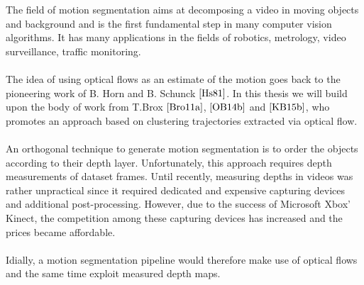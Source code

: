 The field of motion segmentation aims at decomposing a video in moving objects and background and is the first fundamental step in many computer vision algorithms. It has many applications in the fields of robotics, metrology, video surveillance, traffic monitoring. \\ \\
The idea of using optical flows as an estimate of the motion goes back to the pioneering work of B. Horn and B. Schunck $\cite{Hs81}$. In this thesis we will build upon the body of work from T.Brox $\cite{Bro11a}$, $\cite{OB14b}$ and $\cite{KB15b}$, who promotes an approach based on clustering trajectories extracted via optical flow. \\ \\
An orthogonal technique to generate motion segmentation is to order the objects according to their depth layer. Unfortunately, this approach requires depth measurements of dataset frames. Until recently, measuring depths in videos was rather unpractical since it required dedicated and expensive capturing devices and additional post-processing. However, due to the success of Microsoft Xbox' Kinect, the competition among these capturing devices has increased and the prices became affordable. \\ \\
Idially, a motion segmentation pipeline would therefore make use of optical flows and the same time exploit measured depth maps. 

